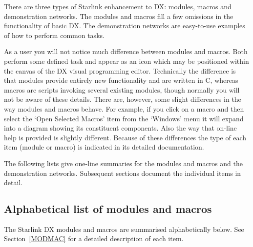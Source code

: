There are three types of Starlink enhancement to DX: modules, macros and
demonstration networks. The modules and macros fill a few omissions in
the functionality of basic DX. The demonstration networks are
easy-to-use examples of how to perform common tasks.

As a user you will not notice much difference between modules and
macros. Both perform some defined task and appear as an icon which may
be positioned within the canvas of the DX visual programming editor.
Technically the difference is that modules provide entirely new
functionality and are written in C, whereas macros are scripts invoking
several existing modules, though normally you will not be aware of these
details. There are, however, some slight differences in the way modules
and macros behave. For example, if you click on a macro and then select
the `Open Selected Macros' item from the `Windows' menu it will expand
into a diagram showing its constituent components. Also the way that
on-line help is provided is slightly different. Because of these
differences the type of each item (module or macro) is indicated in its
detailed documentation.

The following lists give one-line summaries for the modules and
macros and the demonstration networks. Subsequent sections document the
individual items in detail.

\subsection{Alphabetical list of modules and macros}

The Starlink DX modules and macros are summarised alphabetically below.
See Section~\ref{MODMAC} for a detailed description of each item.

